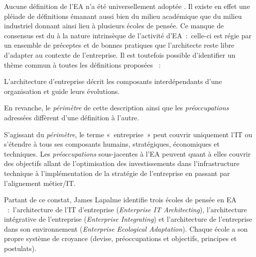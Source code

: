 Aucune définition de l'EA n'a été universellement adoptée
\cite{mentz2012comparison} \cite{ranganathan2005enterprise}. Il existe en effet
une pléiade de définitions émanant aussi bien du milieu académique que du
milieu industriel donnant ainsi lieu à plusieurs écoles de pensée. Ce manque de
consensus est du à la nature intrinsèque de l'activité d'EA~:~celle-ci est
régie par un ensemble de préceptes et de bonnes pratiques que l'architecte
reste libre d'adapter au contexte de l'entreprise.
Il est toutefois possible d'identifier un thème commun à toutes les définitions
proposées~ \cite{lapalme2012three}: 
\\
\begin{definition}
L'architecture d'entreprise décrit les composants interdépendants
d'une organisation et guide leurs évolutions. 
\end{definition}


En revanche, le \textit{périmètre} de cette description ainsi que les
\textit{préoccupations} adressées diffèrent d'une définition à l'autre.

S'agissant du \textit{périmètre}, le terme «~entreprise~» peut couvrir
uniquement l'IT ou s'étendre à tous ses composants humains, stratégiques,
économiques et techniques. Les \textit{préoccupations} sous-jacentes à l'EA
peuvent quant à elles couvrir des objectifs allant de l'optimisation des
investissements dans l'infrastructure technique à l'implémentation de la
stratégie de l'entreprise en passant par l'alignement métier/IT. 

Partant de ce constat, James Lapalme identifie trois écoles de pensée en EA 
\cite{lapalme2012three}~:~l'architecture de l'IT d'entreprise 
(\textit{Enterprise IT Architecting}), l'architecture intégrative de 
l'entreprise 
(\textit{Enterprise Integrating}) et l'architecture de l'entreprise dans son 
environnement (\textit{Enterprise Ecological Adaptation}). Chaque école a son 
propre système de croyance (devise, préoccupations et objectifs, principes et 
postulats).



